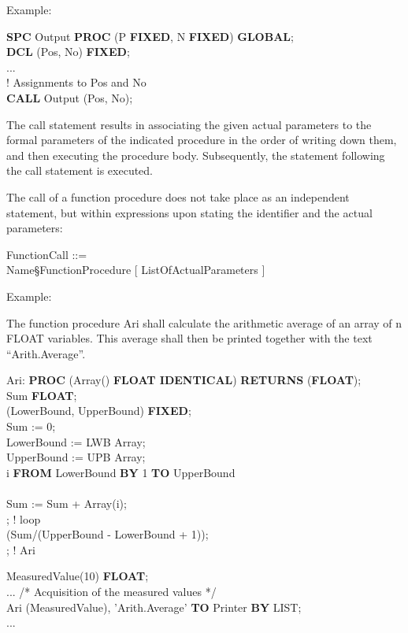Example:

{\bf SPC} Output {\bf PROC} (P {\bf FIXED}, N {\bf FIXED}) {\bf GLOBAL};\\
{\bf DCL} (Pos, No) {\bf FIXED};\\
...\\
! Assignments to Pos and No\\
{\bf CALL} Output (Pos, No);

The call statement results in associating the given actual parameters
to the formal parameters of the indicated procedure in the order of
writing down them, and then executing the procedure body. Subsequently,
the statement following the call statement is executed.

The call of a function procedure does not take place as an independent
statement, but within expressions upon stating the identifier and the
actual parameters:

\begin{front}
FunctionCall ::= \\
\x Name\S FunctionProcedure [ ListOfActualParameters ]
\end{front}
\begin{grammar}

\end{grammar}
Example:

The function procedure Ari shall calculate the arithmetic average of an
array of n FLOAT variables. This average shall then be printed together
with the text ``Arith.Average''.

Ari: {\bf PROC} (Array() {\bf FLOAT IDENTICAL}) {\bf RETURNS} ({\bf FLOAT});\\
\x {} Sum {\bf FLOAT};\\
\x {} (LowerBound, UpperBound) {\bf FIXED};\\
\x \x Sum := 0;\\
\x \x LowerBound := LWB Array; \\
\x \x UpperBound := UPB Array; \\
\x {} i {\bf FROM} LowerBound {\bf BY} 1 {\bf TO} UpperBound\\
\x {}\\
\x \x \x Sum := Sum + Array(i);\\
\x {}; ! loop\\
\x {} (Sum/(UpperBound - LowerBound + 1));\\
; ! Ari

 MeasuredValue(10) {\bf FLOAT};\\
\x ...
\x \x /* Acquisition of the measured values */ \\
 Ari (MeasuredValue), 'Arith.Average' {\bf TO} Printer {\bf BY} LIST;\\
\x ...

